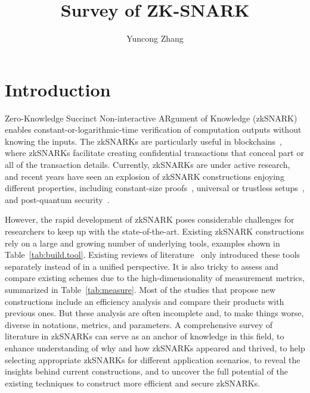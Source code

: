 \documentclass[acmtog]{acmart}
\title{Survey of ZK-SNARK}
\author{Yuncong Zhang}
\begin{document}
\begin{abstract}
\end{abstract}

\maketitle

\section{Introduction}

Zero-Knowledge Succinct Non-interactive ARgument of Knowledge (zkSNARK)~\cite{BitanskyCCT12} enables constant-or-logarithmic-time verification of computation outputs without knowing the inputs.
The zkSNARKs are particularly useful in blockchains~\cite{Ben-SassonCG0MTV14, SunALY17}, where zkSNARKs facilitate creating confidential transactions that conceal part or all of the transaction details.
Currently, zkSNARKs are under active research, and recent years have seen an explosion of zkSNARK constructions enjoying different properties, including constant-size proofs~\cite{Groth16, GennaroGP013, Ben-SassonCGTV13, ParnoHG013, Ben-SassonCTV13}, universal or trustless setups~\cite{GrothKMMM18, MallerBKM19, BunzFS20, Ben-SassonBHR18, Ben-SassonCRSVW19, AmesHIV17}, and post-quantum security~\cite{Ben-SassonBHR18, Ben-SassonCRSVW19}.


However, the rapid development of zkSNARK poses considerable challenges for researchers to keep up with the state-of-the-art.
Existing zkSNARK constructions rely on a large and growing number of underlying tools, examples shown in Table~\ref{tab:build.tool}.
Existing reviews of literature~\cite{ZKProof20, Nitulescu19, WalfishB15} only introduced these tools separately instead of in a unified perspective.
It is also tricky to assess and compare existing schemes due to the high-dimensionality of measurement metrics, summarized in Table~\ref{tab:measure}.
Most of the studies that propose new constructions include an efficiency analysis and compare their products with previous ones.
But these analysis are often incomplete and, to make things worse, diverse in notations, metrics, and parameters.
A comprehensive survey of literature in zkSNARKs can serve as an anchor of knowledge in this field, to enhance understanding of why and how zkSNARKs appeared and thrived, to help selecting appropriate zkSNARKs for different application scenarios, to reveal the insights behind current constructions, and to uncover the full potential of the existing techniques to construct more efficient and secure zkSNARKs.
\end{document}
